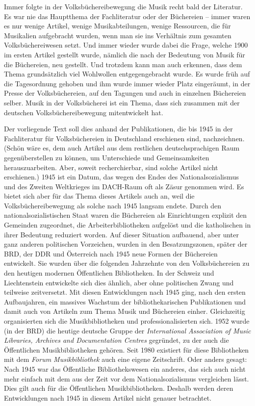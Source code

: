 \documentclass[a4paper,
fontsize=11pt,
oneside,
numbers=noperiodatend,
parskip=half-,
bibliography=totoc,
final
]{scrartcl}
\begin{document}
Immer folgte in der Volksbüchereibewegung die Musik recht bald der
Literatur. Es war nie das Hauptthema der Fachliteratur oder der
Büchereien -- immer waren es nur wenige Artikel, wenige
Musikabteilungen, wenige Ressourcen, die für Musikalien aufgebracht
wurden, wenn man sie ins Verhältnis zum gesamten Volksbüchereiwesen
setzt. Und immer wieder wurde dabei die Frage, welche 1900 im ersten
Artikel gestellt wurde, nämlich die nach der Bedeutung von Musik für die
Büchereien, neu gestellt. Und trotzdem kann man auch erkennen, dass dem
Thema grundsätzlich viel Wohlwollen entgegengebracht wurde. Es wurde
früh auf die Tagesordnung gehoben und ihm wurde immer wieder Platz
eingeräumt, in der Presse der Volksbüchereien, auf den Tagungen und auch
in einzelnen Büchereien selber. Musik in der Volksbücherei ist ein
Thema, dass sich zusammen mit der deutschen Volksbüchereibewegung
mitentwickelt hat.

Der vorliegende Text soll dies anhand der Publikationen, die bis 1945 in
der Fachliteratur für Volksbüchereien in Deutschland erschienen sind,
nachzeichnen. (Schön wäre es, dem auch Artikel aus dem restlichen
deutschsprachigen Raum gegenüberstellen zu können, um Unterschiede und
Gemeinsamkeiten herauszuarbeiten. Aber, soweit recherchierbar, sind
solche Artikel nicht erschienen.) 1945 ist ein Datum, das wegen des
Endes des Nationalsozialismus und des Zweiten Weltkrieges im DACH-Raum
oft als Zäsur genommen wird. Es bietet sich aber für das Thema dieses
Artikels auch an, weil die Volksbüchereibewegung als solche nach 1945
langsam endete. Durch den nationalsozialistischen Staat waren die
Büchereien als Einrichtungen explizit den Gemeinden zugeordnet, die
Arbeiterbibliotheken aufgelöst und die katholischen in ihrer Bedeutung
reduziert worden. Auf dieser Situation aufbauend, aber unter ganz
anderen politischen Vorzeichen, wurden in den Besatzungszonen, später
der BRD, der DDR und Österreich nach 1945 neue Formen der Büchereien
entwickelt. Sie wurden über die folgenden Jahrzehnte von den
Volksbüchereien zu den heutigen modernen Öffentlichen Bibliotheken. In
der Schweiz und Liechtenstein entwickelte sich dies ähnlich, aber ohne
politischen Zwang und teilweise zeitversetzt. Mit diesen Entwicklungen
nach 1945 ging, nach den ersten Aufbaujahren, ein massives Wachstum der
bibliothekarischen Publikationen und damit auch von Artikeln zum Thema
Musik und Büchereien einher. Gleichzeitig organisierten sich die
Musikbibliotheken und professionalisierten sich. 1952 wurde (in der BRD)
die heutige deutsche Gruppe der \emph{International Association of Music
Libraries, Archives and Documentation Centres} gegründet, zu der auch
die Öffentlichen Musikbibliotheken gehören. Seit 1980 existiert für
diese Bibliotheken mit dem \emph{Forum Musikbibliothek} auch eine eigene
Zeitschrift. Oder anders gesagt: Nach 1945 war das Öffentliche
Bibliothekswesen ein anderes, das sich auch nicht mehr einfach mit dem
aus der Zeit vor dem Nationalsozialismus vergleichen lässt. Dies gilt
auch für die Öffentlichen Musikbibliotheken. Deshalb werden deren
Entwicklungen nach 1945 in diesem Artikel nicht genauer betrachtet.
\end{document}
